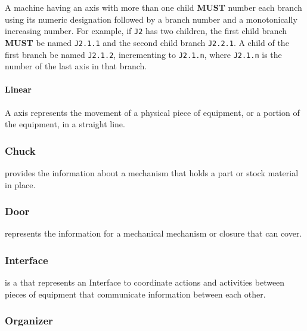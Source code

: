A machine having an axis with more than one child \textbf{MUST} number each branch using its numeric designation followed by a branch number and a monotonically increasing number. For example, if \texttt{J2} has two children, the first child branch \textbf{MUST} be named \texttt{J2.1.1} and the second child branch \texttt{J2.2.1}. A child of the first branch \MUST be named \texttt{J2.1.2}, incrementing to \texttt{J2.1.n}, where \texttt{J2.1.n} is the number of the last axis in that branch.


\paragraph{Linear}\mbox{}
\label{sec:Linear}


A  axis represents the movement of a physical piece of equipment, or a portion of the equipment, in a straight line. 


\subsubsection{Chuck}
\label{sec:Chuck}



 provides the information about a mechanism that holds a part or stock material in place.


\subsubsection{Door}
\label{sec:Door}



 represents the information for a mechanical mechanism or closure that can cover.


\subsubsection{Interface}
\label{sec:Interface}



 is a  that represents an \gls{Interface} to coordinate actions and activities between pieces of equipment that communicate information between each other.


\subsubsection{Organizer}
\label{sec:Organizer}



